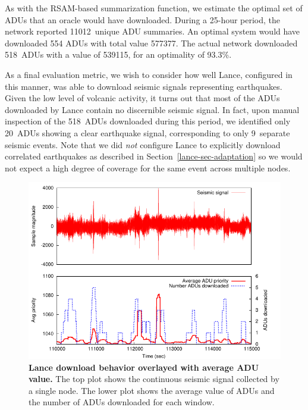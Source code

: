 As with the RSAM-based summarization function, we estimate the optimal set of
ADUs that an oracle would have downloaded. During a 25-hour period, the
network reported 11012~unique ADU summaries. An optimal system would have
downloaded 554 ADUs with total value 577377. The actual network downloaded
518~ADUs with a value of 539115, for an optimality of 93.3\%.

As a final evaluation metric, we wish to consider how well Lance, configured
in this manner, was able to download seismic signals representing
earthquakes. Given the low level of volcanic activity, it turns out that most
of the ADUs downloaded by Lance contain no discernible seismic signal. In
fact, upon manual inspection of the 518~ADUs downloaded during this period,
we identified only 20~ADUs showing a clear earthquake signal, corresponding
to only 9~separate seismic events. Note that we did \textit{not} configure
Lance to explicitly download correlated earthquakes as described in
Section~\ref{lance-sec-adaptation} so we would not expect a high degree of
coverage for the same event across multiple nodes.

\begin{figure}[t]
\begin{center}
\includegraphics[width=1.0\hsize]{./4-lance/figs/everything.pdf}
\end{center}

\caption{\textbf{Lance download behavior overlayed with average ADU value.}
The top plot shows the continuous seismic signal collected by a single node.
The lower plot shows the average value of ADUs and the number of ADUs
downloaded for each window.}

\label{lance-fig-everything}
\end{figure}

